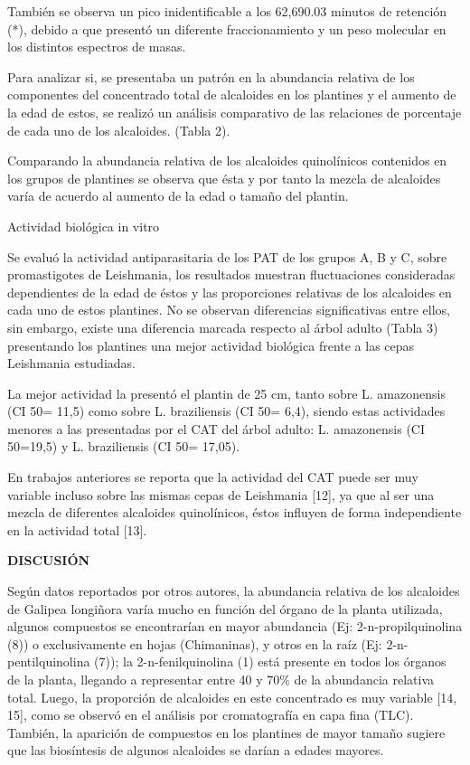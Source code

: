 \documentclass{article}
\begin{document}
También se observa un pico inidentificable a los 62,690.03 minutos de retención
(*), debido a que presentó un diferente fraccionamiento y un peso molecular en
los distintos espectros de masas.

Para analizar si, se presentaba un patrón en la abundancia relativa de los
componentes del concentrado total de alcaloides en los plantines y el aumento de
la edad de estos, se realizó un análisis comparativo de las relaciones de
porcentaje de cada uno de los alcaloides. (Tabla 2).

\begin{Center}
\end{Center}

Comparando la abundancia relativa de los alcaloides quinolínicos contenidos en
los grupos de plantines se observa que ésta y por tanto la mezcla de alcaloides
varía de acuerdo al aumento de la edad o tamaño del plantin.

Actividad biológica in vitro

Se evaluó la actividad antiparasitaria de los PAT de los grupos A, B y C, sobre
promastigotes de Leishmania, los resultados muestran fluctuaciones consideradas
dependientes de la edad de éstos y las proporciones relativas de los alcaloides
en cada uno de estos plantines. No se observan diferencias significativas entre
ellos, sin embargo, existe una diferencia marcada respecto al árbol adulto
(Tabla 3) presentando los plantines una mejor actividad biológica frente a las
cepas Leishmania estudiadas.

La mejor actividad la presentó el plantin de 25 cm, tanto sobre L. amazonensis
(CI 50= 11,5) como sobre L. braziliensis (CI 50= 6,4), siendo estas actividades
menores a las presentadas por el CAT del árbol adulto: L. amazonensis (CI
50=19,5) y L. braziliensis (CI 50= 17,05).

\begin{Center}
\end{Center}

En trabajos anteriores se reporta que la actividad del CAT puede ser muy
variable incluso sobre las mismas cepas de Leishmania [12], ya que al ser una
mezcla de diferentes alcaloides quinolínicos, éstos influyen de forma
independiente en la actividad total [13].

\textbf{DISCUSIÓN}

Según datos reportados por otros autores, la abundancia relativa de los
alcaloides de Galipea longiñora varía mucho en función del órgano de la planta
utilizada, algunos compuestos se encontrarían en mayor abundancia (Ej:
2-n-propilquinolina (8)) o exclusivamente en hojas (Chimaninas), y otros en la
raíz (Ej: 2-n-pentilquinolina (7)); la 2-n-fenilquinolina (1) está presente en
todos los órganos de la planta, llegando a representar entre 40 y 70\% de la
abundancia relativa total. Luego, la proporción de alcaloides en este
concentrado es muy variable [14, 15], como se observó en el análisis por
cromatografía en capa fina (TLC). También, la aparición de compuestos en los
plantines de mayor tamaño sugiere que las biosíntesis de algunos alcaloides se
darían a edades mayores.
\end{document}
